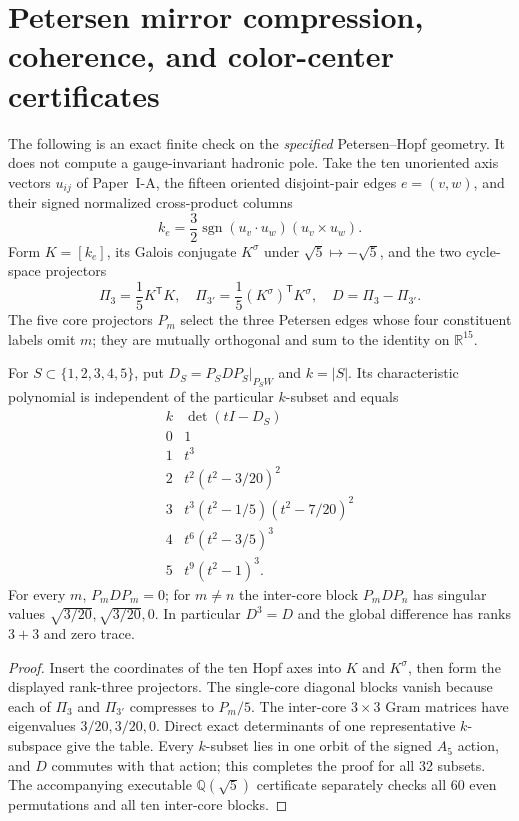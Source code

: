 \documentclass[12pt,a4paper]{article}
\begin{document}
\section{Petersen mirror compression, coherence, and color-center certificates}
\label{p13:sec:v323-petersen-proof}
The following is an exact finite check on the \emph{specified}
Petersen--Hopf geometry.  It does not compute a gauge-invariant
hadronic pole.  Take the ten unoriented axis vectors $u_{ij}$ of
Paper~I-A, the fifteen oriented disjoint-pair edges $e=(v,w)$,
and their signed normalized cross-product columns
\[
 k_e=\frac32\operatorname{sgn}(u_v\cdot u_w)(u_v\times u_w).
\]
Form $K=[k_e]$, its Galois conjugate $K^\sigma$ under
$\sqrt5\mapsto-\sqrt5$, and the two cycle-space projectors
\[
 \Pi_3=\frac15K^{\mathsf T}K,\quad
 \Pi_{3'}=\frac15(K^\sigma)^{\mathsf T}K^\sigma,\quad
 D=\Pi_3-\Pi_{3'}.
\]
The five core projectors $P_m$ select the three Petersen edges whose
four constituent labels omit $m$; they are mutually orthogonal and
sum to the identity on $\mathbb R^{15}$.

\begin{proposition}
\label{p13:prop:v323-petersen-charpolys}
For $S\subset\{1,2,3,4,5\}$, put
$D_S=P_SDP_S|_{P_SW}$ and $k=|S|$.  Its characteristic polynomial
is independent of the particular $k$-subset and equals
\[
\begin{array}{c|l}
 k&\det(tI-D_S)\\\hline
 0&1\\
 1&t^3\\
 2&t^2(t^2-3/20)^2\\
 3&t^3(t^2-1/5)(t^2-7/20)^2\\
 4&t^6(t^2-3/5)^3\\
 5&t^9(t^2-1)^3.
\end{array}
\]
For every $m$, $P_mDP_m=0$; for $m\ne n$ the inter-core block
$P_mDP_n$ has singular values
$\sqrt{3/20},\sqrt{3/20},0$.  In particular
$D^3=D$ and the global difference has ranks $3+3$ and zero trace.
\end{proposition}
\begin{proof}
Insert the coordinates of the ten Hopf axes into $K$ and
$K^\sigma$, then form the displayed rank-three projectors.  The
single-core diagonal blocks vanish because each of $\Pi_3$ and
$\Pi_{3'}$ compresses to $P_m/5$.  The inter-core $3\times3$ Gram
matrices have eigenvalues $3/20,3/20,0$.  Direct exact determinants
of one representative $k$-subspace give the table.  Every $k$-subset
lies in one orbit of the signed $A_5$ action, and $D$ commutes with
that action; this completes the proof for all 32 subsets.  The
accompanying executable $\mathbb Q(\sqrt5)$ certificate separately
checks all 60 even permutations and all ten inter-core blocks.
\end{proof}
\end{document}
